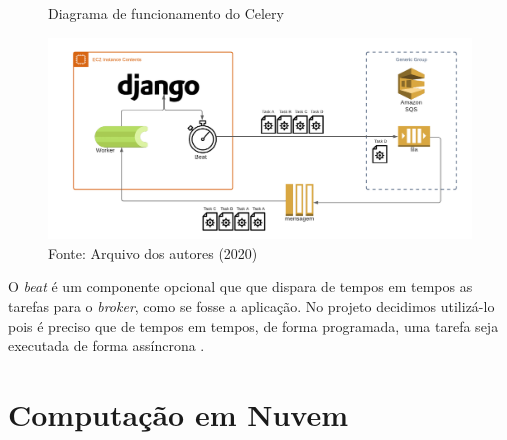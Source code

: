 \begin{figure}[H]
    \centering
    \caption{Diagrama de funcionamento do Celery}
    \includegraphics[width=1.0\linewidth]{Imagens/diagramaCelery.png}
    \caption*{Fonte: Arquivo dos autores (2020)}
    \label{DiagramaDeBlocosIcones}
\end{figure}
\indent 
\par O \textit{beat} é um componente opcional que que dispara de tempos em tempos as tarefas para o \textit{broker}, como se fosse a aplicação. No projeto decidimos utilizá-lo pois é preciso que de tempos em tempos, de forma programada, uma tarefa seja executada de forma assíncrona \cite{CeleryTAP}.

\section{Computação em Nuvem}


